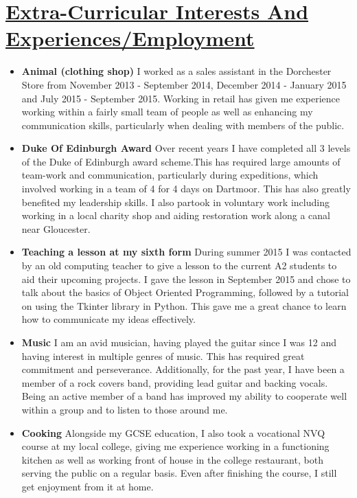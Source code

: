 \documentclass[11pt]{article}
\begin{document}
	\vspace{-20pt}
	\hspace{-100pt}\section*{\underline{Extra-Curricular Interests And Experiences/Employment}}
			\begin{itemize}
				\item \textbf{Animal (clothing shop) }I worked as a sales assistant in the Dorchester Store from November 2013 - September 2014, December 2014 - January 2015 and July 2015 - September 2015. Working in retail has given me experience working within a fairly small team of people as well as enhancing my communication skills, particularly when dealing with members of the public. 
				\item \textbf{Duke Of Edinburgh Award} Over recent years I have completed all 3 levels of the Duke of Edinburgh award scheme.This has required large amounts of team-work and communication, particularly during expeditions, which involved working in a team of 4 for 4 days on Dartmoor. This has also greatly benefited my leadership skills. I also partook in voluntary work including working in a local charity shop and aiding restoration work along a canal near Gloucester.
				\item \textbf{Teaching a lesson at my sixth form} During summer 2015 I was contacted by an old computing teacher to give a lesson to the current A2 students to aid their upcoming projects. I gave the lesson in September 2015 and chose to talk about the basics of Object Oriented Programming, followed by a tutorial on using the Tkinter library in Python. This gave me a great chance to learn how to communicate my ideas effectively. 
				\item \textbf{Music} I am an avid musician, having played the guitar since I was 12 and having interest in multiple genres of music. This has required great commitment and perseverance. Additionally, for the past year, I have been a member of a rock covers band, providing lead guitar and backing vocals. Being an active member of a band has improved my ability to cooperate well within a group and to listen to those around me. 
				\item \textbf{Cooking} Alongside my GCSE education, I also took a vocational NVQ course at my local college, giving me experience working in a functioning kitchen as well as working front of house in the college restaurant, both serving the public on a regular basis. Even after finishing the course, I still get enjoyment from it at home.
			\end{itemize}
\end{document}
